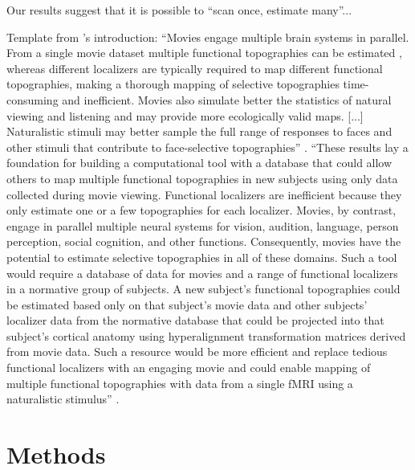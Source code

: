 

Our results suggest that it is possible to ``scan once, estimate many''...

%
Template from \citet{jiahui2020predicting}'s introduction: ``Movies engage
multiple brain systems in parallel. From a single movie dataset multiple
functional topographies can be estimated \citep{guntupalli2016model}, whereas
different localizers are typically required to map different functional
topographies, making a thorough mapping of selective topographies time-consuming
and inefficient. Movies also simulate better the statistics of natural viewing
and listening and may provide more ecologically valid maps. [...] Naturalistic
stimuli may better sample the full range of responses to faces and other stimuli
that contribute to face-selective topographies'' \citep{jiahui2020predicting}.
%
``These results lay a foundation for building a computational tool with a
database that could allow others to map multiple functional topographies in new
subjects using only data collected during movie viewing. Functional localizers
are inefficient because they only estimate one or a few topographies for each
localizer. Movies, by contrast, engage in parallel multiple neural systems for
vision, audition, language, person perception, social cognition, and other
functions. Consequently, movies have the potential to estimate selective
topographies in all of these domains. Such a tool would require a database of
data for movies and a range of functional localizers in a normative group of
subjects. A new subject's functional topographies could be estimated based only
on that subject's movie data and other subjects' localizer data from the
normative database that could be projected into that subject's cortical anatomy
using hyperalignment transformation matrices derived from movie data. Such a
resource would be more efficient and replace tedious functional localizers with
an engaging movie and could enable mapping of multiple functional topographies
with data from a single fMRI using a naturalistic stimulus''
\citet{jiahui2020predicting}.


\section{Methods}



